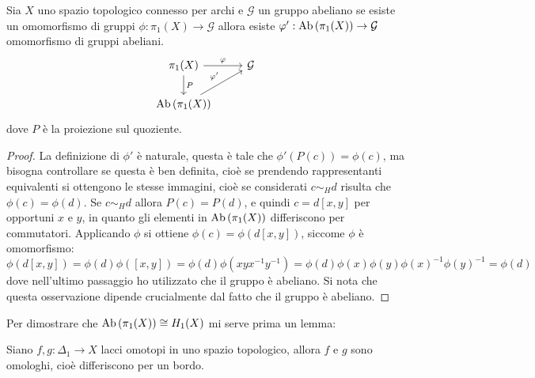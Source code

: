 
\begin{osservation}
  Sia $ X $ uno spazio topologico connesso per archi e $ \mathcal{G} $ un gruppo
  abeliano se esiste un omomorfismo di gruppi $ \phi: \pi_1(X) \to \mathcal{G} $ allora
  esiste $ \varphi' : \mathrm{Ab}\left( \pi_1(X) \right) \to \mathcal{G} $ omomorfismo di gruppi abeliani.
  \[
    \begin{tikzcd}
      \pi_1(X) \arrow{r}{\phi} \arrow{d}{P} & \mathcal{G} \\
      \Ab{\pi_1(X)} \arrow{ur}{\phi'}
    \end{tikzcd}
  \]
  dove $ P $ è la proiezione sul quoziente.
\end{osservation}
\begin{proof}
  La definizione di $ \phi' $ è naturale, questa è tale che
  $ \phi'(P(c)) = \phi(c) $, ma bisogna controllare se questa è ben definita, cioè se
  prendendo rappresentanti equivalenti si ottengono le stesse immagini, cioè se
  considerati $ c \sim_H d $ risulta che $ \phi(c) = \phi(d) $. Se
  $ c \sim_H d $ allora $ P(c) = P(d) $, e quindi $ c = d[x,y] $ per opportuni
  $ x $ e $ y $, in quanto gli elementi in $ \mathrm{Ab}\left( \pi_1(X) \right) $ differiscono per
  commutatori. Applicando $ \phi $ si ottiene $ \phi(c) = \phi(d[x,y]) $, siccome
  $ \phi $ è omomorfismo:
  \[
    \phi(d[x,y]) = \phi(d)\phi([x,y]) = \phi(d) \phi(xyx^{-1}y^{-1}) = \phi(d) \phi(x) \phi(y) \phi(x)^{-1} \phi(y)^{-1} = \phi(d)
  \]
  dove nell'ultimo passaggio ho utilizzato che il gruppo è abeliano.
  Si nota che questa osservazione dipende crucialmente dal fatto che il gruppo è abeliano.
\end{proof}
\eproof
Per dimostrare che $ \mathrm{Ab}\left( \pi_1(X) \right) \cong H_1(X) $ mi serve prima un lemma:
\begin{lemma}
  Siano $ f, g \colon \Delta_1 \to X $ lacci omotopi in uno spazio topologico, allora
  $ f $ e $ g $ sono omologhi, cioè differiscono per un bordo.
\end{lemma}
